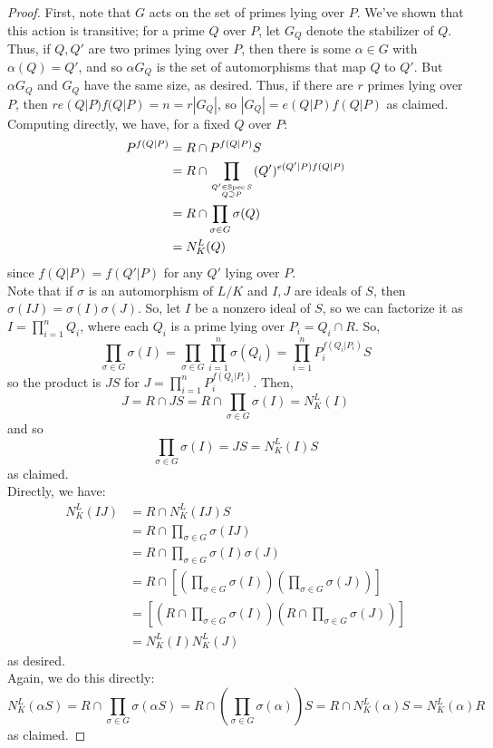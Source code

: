 \begin{proof}
	First, note that $G$ acts on the set of primes lying over $P$. We've shown that this action is transitive; for a prime $Q$ over $P$, let $G_Q$ denote the stabilizer of $Q$. Thus, if $Q,Q'$ are two primes lying over $P$, then there is some $\alpha \in G$ with $\alpha(Q) = Q'$, and so $\alpha G_Q$ is the set of automorphisms that map $Q$ to $Q'$. But $\alpha G_Q$ and $G_Q$ have the same size, as desired. Thus, if there are $r$ primes lying over $P$, then $re(Q|P)f(Q|P) = n = r|G_Q|$, so $|G_Q| = e(Q|P)f(Q|P)$ as claimed. \\
	
	Computing directly, we have, for a fixed $Q$ over $P$:
	\begin{align*}
	P^{f(Q|P)}
		&= R \cap P^{f(Q|P)}S \\
		&= R \cap \prod_{Q' \in \operatorname{Spec} S \atop Q \supseteq P} (Q')^{e(Q'|P)f(Q|P)} \\
		&= R \cap \prod_{\sigma \in G} \sigma(Q) \\
		&= N_K^L(Q)
	\end{align*}
	since $f(Q|P) = f(Q'|P)$ for any $Q'$ lying over $P$. \\
	
	Note that if $\sigma$ is an automorphism of $L/K$ and $I,J$ are ideals of $S$, then $\sigma(IJ) = \sigma(I)\sigma(J)$. So, let $I$ be a nonzero ideal of $S$, so we can factorize it as $I = \prod_{i=1}^n Q_i$, where each $Q_i$ is a prime lying over $P_i = Q_i \cap R$. So,
	\[ \prod_{\sigma \in G} \sigma(I) = \prod_{\sigma \in G} \prod_{i=1}^n \sigma(Q_i) = \prod_{i=1}^n P_i^{f(Q_i|P_i)}S \]
	so the product is $JS$ for $J = \prod_{i=1}^n P_i^{f(Q_i|P_i)}$. Then,
	\[ J = R \cap JS = R \cap \prod_{\sigma \in G} \sigma(I) = N_K^L(I) \]
	and so
	\[ \prod_{\sigma \in G} \sigma(I) = JS = N_K^L(I)S \]
	as claimed. \\
	
	Directly, we have:
	\begin{align*}
	N_K^L(IJ)
		&= R \cap N_K^L(IJ)S \\
		&= R \cap \prod_{\sigma \in G} \sigma(IJ) \\
		&= R \cap \prod_{\sigma \in G} \sigma(I)\sigma(J) \\
		&= R \cap \left[\left(\prod_{\sigma \in G} \sigma(I)\right)\left(\prod_{\sigma \in G} \sigma(J)\right)\right] \\
		&= \left[\left(R \cap \prod_{\sigma \in G} \sigma(I)\right)\left(R \cap \prod_{\sigma \in G} \sigma(J)\right)\right] \\
		&= N_K^L(I)N_K^L(J)
	\end{align*}
	as desired. \\
	
	Again, we do this directly:
	\[ N_K^L(\alpha S) = R \cap \prod_{\sigma \in G} \sigma(\alpha S) = R \cap \left(\prod_{\sigma \in G} \sigma(\alpha)\right)S = R \cap N_K^L(\alpha)S = N_K^L(\alpha)R \]
	as claimed.
\end{proof}
